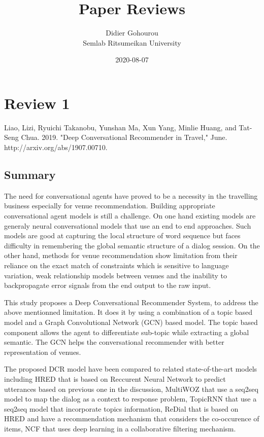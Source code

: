 \documentclass{article}
\begin{document}
\title{Paper Reviews}
\author{Didier Gohourou\\ Semlab Ritsumeikan University}
\date{2020-08-07}
\maketitle

\section*{Review 1}
Liao, Lizi, Ryuichi Takanobu, Yunshan Ma, Xun Yang, Minlie Huang, 
and Tat-Seng Chua. 2019. "Deep Conversational Recommender in Travel," 
June. http://arxiv.org/abs/1907.00710.

\subsection*{Summary}
The need for conversational agents have proved to be a necessity in the 
travelling business especially for venue recommendation. Building appropriate 
conversational agent models is still a challenge. On one hand existing models 
are generaly neural conversational models that use an end to end approaches. 
Such models are good at capturing the local structure of word sequence 
but faces difficulty in remembering the global semantic structure of a 
dialog session. On the other hand, methods for venue recommendation show
limitation from their reliance on the exact match of constraints which is 
sensitive to language variation, weak relationship models between venues 
and the inability to backpropagate error signals from the end output to 
the raw input.

This study proposes a Deep Conversational Recommender System, to address the 
above mentionned limitation. It does it by using a combination of a 
topic based model and a Graph Convolutional Network (GCN) based model. 
The topic based component allows the agent to differentiate sub-topic 
while extracting a global semantic. The GCN helps the conversational 
recommender with better representation of venues.

The proposed DCR model have been compared to related state-of-the-art 
models including HRED that is based on Reccurent Neural Network to 
predict utterances based on previous one in the discussion, MultiWOZ that 
use a seq2seq model to map the dialog as a context to response problem, 
TopicRNN that use a seq2seq model that incorporate topics information, 
ReDial that is based on HRED and have a recommendation mechanism that 
considers the co-occurence of items, NCF that uses deep learning in 
a collaborative filtering mechanism. 
\end{document}
